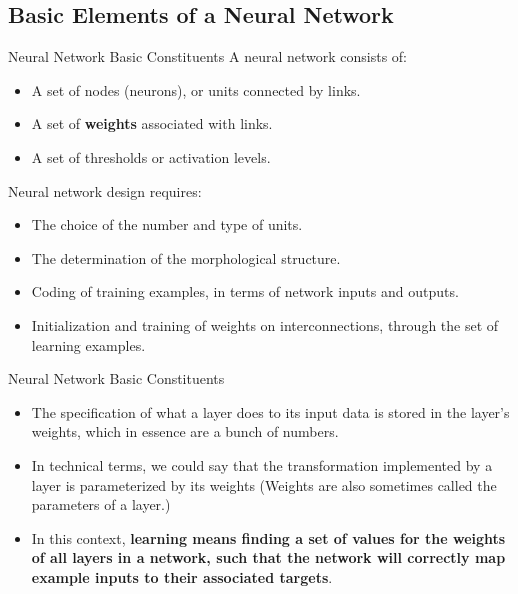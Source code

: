 \documentclass[11pt]{beamer}
\begin{document}
\subsection{Basic Elements of a Neural Network}
\begin{frame}{Neural Network Basic Constituents}
A neural network consists of:
	\begin{itemize}
		\item A set of nodes (neurons), or units connected by links.
		\item A set of \textbf{weights} associated with links.
		\item A set of thresholds or activation levels.
	\end{itemize}
Neural network design requires:
\begin{itemize}
		\item The choice of the number and type of units.
		\item The determination of the morphological structure.
		\item Coding of training examples, in terms of network inputs and outputs.
		\item Initialization and training of weights on interconnections, through the set of learning examples.
\end{itemize}
\end{frame}
\begin{frame}{Neural Network Basic Constituents}
	\begin{itemize}
		\item The specification of what a layer does to its input data is stored in the layer's weights, which in essence are a bunch of numbers. 
		\item In technical terms, we could say that the transformation implemented by a layer is parameterized by its weights (Weights are also sometimes called the parameters of a layer.) 
		\item In this context, \textbf{learning means finding a set of values for the weights of all layers in a network, such that the network will correctly map example inputs to their associated targets}.
	\end{itemize}
\end{frame}
\end{document}
